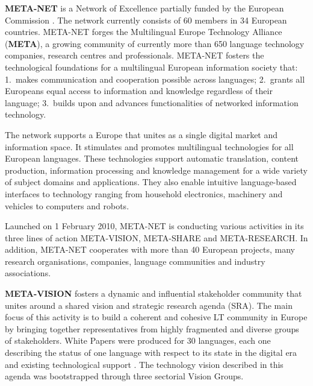 \documentclass[10pt, plain]{../../metanetpaper}
\begin{document}

\begin{multicols}{2}
  \textbf{META-NET} is a Network of Excellence partially funded by the European Commission \cite{rehm2011}.  The network currently consists of 60 members in 34 European countries. META-NET forges the Multilingual Europe Technology Alliance (\textbf{META}), a growing community of currently more than 650 language technology companies, research centres and professionals. META-NET fosters the technological foundations for a multilingual European information society that: 1.~makes communication and cooperation possible across languages; 2.~grants all Europeans equal access to information and knowledge regardless of their language; 3.~builds upon and advances functionalities of networked information technology.

The network supports a Europe that unites as a single digital market and information space. It stimulates and promotes multilingual technologies for all European languages. These technologies support automatic translation, content production, information processing and knowledge management for a wide variety of subject domains and applications. They also enable intuitive language-based interfaces to technology ranging from household electronics, machinery and vehicles to computers and robots.

Launched on 1 February 2010, META-NET is conducting various activities in its three lines of action META-VISION, META-SHARE and META-RESEARCH. In addition, META-NET cooperates with more than 40 European projects, many research organisations, companies, language communities and industry associations.

\textbf{META-VISION} fosters a dynamic and influential stakeholder community that unites around a shared vision and strategic research agenda (SRA). The main focus of this activity is to build a coherent and cohesive LT community in Europe by bringing together representatives from highly fragmented and diverse groups of stakeholders. White Papers were produced for 30 languages, each one describing the status of one language with respect to its state in the digital era and existing technological support \cite{LWP2012}. The technology vision described in this agenda was bootstrapped through three sectorial Vision Groups. 


\end{multicols}
\end{document}
